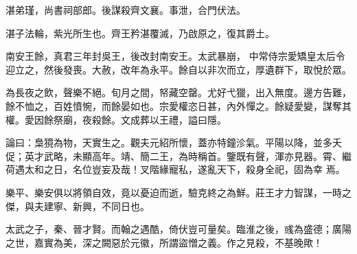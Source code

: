 \begin{pinyinscope}
 湛弟瑾，尚書祠部郎。後謀殺齊文襄。事泄，合門伏法。



 湛子法輪，紫光所生也。齊王矜湛覆滅，乃啟原之，復其爵土。



 南安王餘，真君三年封吳王，後改封南安王。太武暴崩，
 中常侍宗愛矯皇太后令迎立之，然後發喪。大赦，改年為永平。餘自以非次而立，厚遺群下，取悅於眾。



 為長夜之飲，聲樂不絕。旬月之間，帑藏空罄。尤好弋獵，出入無度。邊方告難，餘不恤之，百姓憤惋，而餘晏如也。宗愛權恣日甚，內外憚之。餘疑愛變，謀奪其權。愛因餘祭廟，夜殺餘。文成葬以王禮，謚曰隱。



 論曰：梟獍為物，天實生之。觀夫元紹所懷，蓋亦特鐘沴氣。平陽以降，並多夭促；英才武略，未顯高年。靖、簡二王，為時稱首。鑒既有聲，渾亦見器。霄、繼荷遇太和之日，名位豈妄及哉！叉階緣寵私，遂亂天下，殺身全祀，固為幸
 焉。



 樂平、樂安俱以將領自效，竟以憂迫而逝，驗克終之為鮮。莊王才力智謀，一時之傑，與夫建寧、新興，不同日也。



 太武之子，秦、晉才賢。而翰之遇酷，倚伏豈可量矣。臨淮之後，彧為盛德；廣陽之世，嘉實為美，深之闕惡於元徽，所謂盜憎之義。作之見殺，不基晚歟！



\end{pinyinscope}